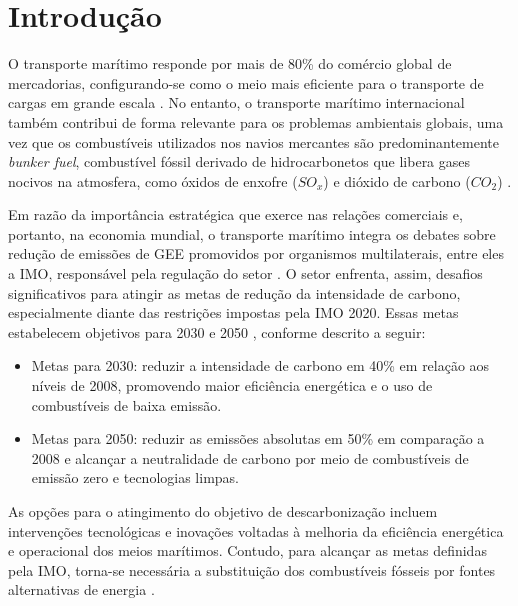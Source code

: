 \chapter{Introdução}
\label{chap_introducao}

O transporte marítimo responde por mais de 80\% do comércio global de mercadorias, configurando-se como o meio mais eficiente para o transporte de cargas em grande escala \citep{unctad_transport_2025}. No entanto, o transporte marítimo internacional também contribui de forma relevante para os problemas ambientais globais, uma vez que os combustíveis utilizados nos navios mercantes são predominantemente \emph{bunker fuel}, combustível fóssil derivado de hidrocarbonetos que libera gases nocivos na atmosfera, como óxidos de enxofre ($SO_x$) e dióxido de carbono ($CO_2$) \citep{international_maritime_organization_fourth_2020,van_global_2019}.

Em razão da importância estratégica que exerce nas relações comerciais e, portanto, na economia mundial, o transporte marítimo integra os debates sobre redução de emissões de \gls{GEE} promovidos por organismos multilaterais, entre eles a \gls{IMO}, responsável pela regulação do setor \citep{international_maritime_organization_fourth_2020,imo2023strategy}. O setor enfrenta, assim, desafios significativos para atingir as metas de redução da intensidade de carbono, especialmente diante das restrições impostas pela \gls{IMO} 2020. Essas metas estabelecem objetivos para 2030 e 2050 \citep{imo_imo_2020,imo2023strategy}, conforme descrito a seguir:

\begin{itemize}
  \item Metas para 2030: reduzir a intensidade de carbono em 40\% em relação aos níveis de 2008, promovendo maior eficiência energética e o uso de combustíveis de baixa emissão.
  \item Metas para 2050: reduzir as emissões absolutas em 50\% em comparação a 2008 e alcançar a neutralidade de carbono por meio de combustíveis de emissão zero e tecnologias limpas.
\end{itemize}

As opções para o atingimento do objetivo de descarbonização incluem intervenções tecnológicas e inovações voltadas à melhoria da eficiência energética e operacional dos meios marítimos. Contudo, para alcançar as metas definidas pela \gls{IMO}, torna-se necessária a substituição dos combustíveis fósseis por fontes alternativas de energia \citep{imo2023strategy,international_council_on_clean_transportation_potential_2021}.

